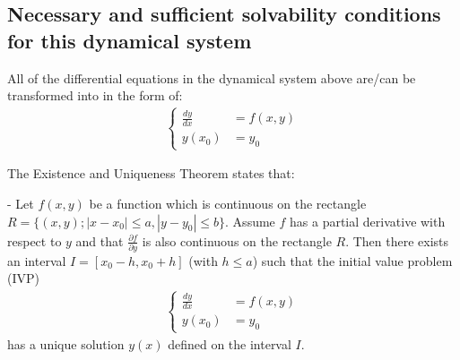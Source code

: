 \documentclass[a4paper]{article}
\numberwithin{equation}{section}
\begin{document}
\subsection{Necessary and sufficient solvability conditions for this dynamical system}
All of the differential equations in the dynamical system above are/can be transformed into in the form of:
\begin{align*}
  \begin{cases}
    \frac{dy}{dx} & = f(x,y) \\
    y(x_0)        & = y_0
  \end{cases}
\end{align*}

The Existence and Uniqueness Theorem states that:

- Let \( f(x,y) \) be a function which is continuous on the rectangle  \( R = \{(x, y); |x - x_0| \leq a, |y - y_0| \leq b\} \).
Assume \( f \) has a partial derivative with respect to \( y \) and that \( \frac{\partial f}{\partial y} \) is also continuous on the rectangle \( R \).
Then there exists an interval \( I=[x_0-h, x_0+h] \) (with \( h \leq a \)) such that the initial value problem (IVP)
\begin{align*}
  \begin{cases}
    \frac{dy}{dx} & = f(x,y) \\
    y(x_0)        & = y_0
  \end{cases}
\end{align*}
has a unique solution \( y(x) \) defined on the interval \( I \).
\end{document}
